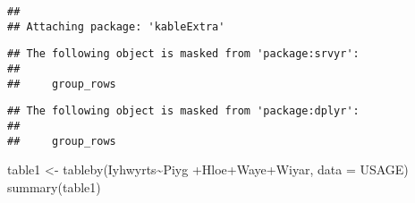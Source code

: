 \documentclass[
]{article}
\newenvironment{Shaded}{\begin{snugshade}}{\end{snugshade}}
\newcommand{\AttributeTok}[1]{\textcolor[rgb]{0.77,0.63,0.00}{#1}}
\newcommand{\FunctionTok}[1]{\textcolor[rgb]{0.00,0.00,0.00}{#1}}
\newcommand{\NormalTok}[1]{#1}
\newcommand{\OtherTok}[1]{\textcolor[rgb]{0.56,0.35,0.01}{#1}}
\newcommand{\SpecialCharTok}[1]{\textcolor[rgb]{0.00,0.00,0.00}{#1}}
\begin{document}
\begin{verbatim}
## 
## Attaching package: 'kableExtra'
\end{verbatim}

\begin{verbatim}
## The following object is masked from 'package:srvyr':
## 
##     group_rows
\end{verbatim}

\begin{verbatim}
## The following object is masked from 'package:dplyr':
## 
##     group_rows
\end{verbatim}

\begin{Shaded}
\begin{Highlighting}[]
\NormalTok{table1 }\OtherTok{\textless{}{-}}  \FunctionTok{tableby}\NormalTok{(Iyhwyrts}\SpecialCharTok{\textasciitilde{}}\NormalTok{Piyg }\SpecialCharTok{+}\NormalTok{Hloe}\SpecialCharTok{+}\NormalTok{Waye}\SpecialCharTok{+}\NormalTok{Wiyar, }\AttributeTok{data =}\NormalTok{ USAGE)}
\FunctionTok{summary}\NormalTok{(table1)}
\end{Highlighting}
\end{Shaded}
\end{document}
